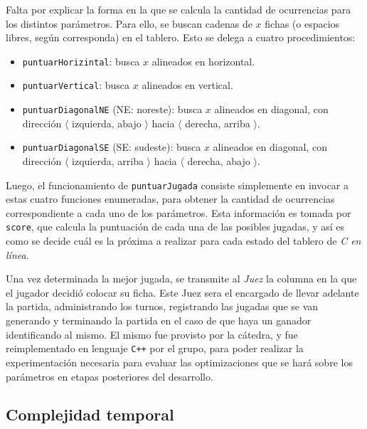 \documentclass[12pt,a4paper]{article}
\begin{document}
    Falta por explicar la forma en la que se calcula la cantidad de ocurrencias para los distintos parámetros. Para ello, se buscan cadenas de $x$ fichas (o espacios libres, según corresponda) en el tablero. Esto se delega a cuatro procedimientos:
        \begin{itemize}
            \item \texttt{puntuarHorizintal}: busca $x$ alineados en horizontal.
            \item \texttt{puntuarVertical}: busca $x$ alineados en vertical.
            \item \texttt{puntuarDiagonalNE} (NE: noreste): busca $x$ alineados en diagonal, con dirección $\langle$ izquierda, abajo $\rangle$ hacia $\langle$ derecha, arriba $\rangle$.
            \item \texttt{puntuarDiagonalSE} (SE: sudeste): busca $x$ alineados en diagonal, con dirección $\langle$ izquierda, arriba $\rangle$ hacia $\langle$ derecha, abajo $\rangle$.
        \end{itemize}
        
    Luego, el funcionamiento de \texttt{puntuarJugada} consiste simplemente en invocar a estas cuatro funciones enumeradas, para obtener la cantidad de ocurrencias correspondiente a cada uno de los parámetros. Esta información es tomada por \texttt{score}, que calcula la puntuación de cada una de las posibles jugadas, y así es como se decide cuál es la próxima a realizar para cada estado del tablero de \textit{C en línea}.
    
    Una vez determinada la mejor jugada, se transmite al \textit{Juez} la columna en la que el jugador decidió colocar su ficha. Este Juez sera el encargado de llevar adelante la partida, administrando los turnos, registrando las jugadas que se van generando y terminando la partida en el caso de que haya un ganador identificando al mismo. El mismo fue provisto por la cátedra, y fue reimplementado en lenguaje \texttt{C++} por el grupo, para poder realizar la experimentación necesaria para evaluar las optimizaciones que se hará sobre los parámetros en etapas posteriores del desarrollo.
    
    
    \subsection{Complejidad temporal}
    
    

\newpage

\end{document}
